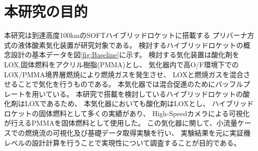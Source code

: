 \section{本研究の目的}
本研究は到達高度100kmのSOFTハイブリッドロケットに搭載する
プリバーナ方式の液体酸素気化装置が研究対象である。
検討するハイブリッドロケットの概念設計の基本データを図\ref{fig:Baseline}に示す。
検討する気化装置は酸化剤をLOX,固体燃料をアクリル樹脂(PMMA)とし、
気化器内で高O/F環境下でのLOX/PMMA境界層燃焼により燃焼ガスを発生させ、
LOXと燃焼ガスを混合させることで気化を行うものである。
本気化器では混合促進のためにバッフルプレートを用いている。
本研究で搭載を検討しているハイブリッドロケットの酸化剤はLOXであるため、
本気化器においても酸化剤はLOXとし、
ハイブリッドロケットの固体燃料として多くの実績があり、
High-Speedカメラによる可視化が行えるPMMAを固体燃料として使用した。
この気化器に関して、小流量ケースでの燃焼流の可視化及び基礎データ取得実験を行い、
実験結果を元に実証機レベルの設計計算を行うことで実現性について調査することが目的である。
